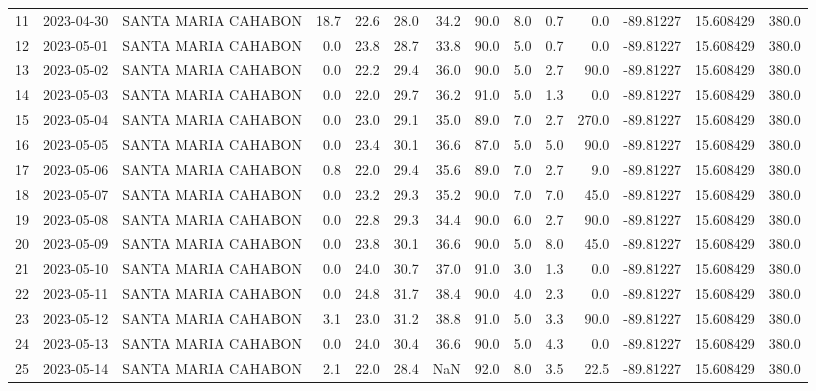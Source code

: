 \documentclass[12pt]{article}
\begin{document}
\begin{center}
\begin{tabular}{lllrrrrrrrrrrr}
11  & 2023-04-30 &  SANTA MARIA CAHABON &    18.7 &  22.6 &   28.0 &  34.2 &     90.0 &  8.0 &         0.7 &         0.0 & -89.81227 &  15.608429 &    380.0 \\
12  & 2023-05-01 &  SANTA MARIA CAHABON &     0.0 &  23.8 &   28.7 &  33.8 &     90.0 &  5.0 &         0.7 &         0.0 & -89.81227 &  15.608429 &    380.0 \\
13  & 2023-05-02 &  SANTA MARIA CAHABON &     0.0 &  22.2 &   29.4 &  36.0 &     90.0 &  5.0 &         2.7 &        90.0 & -89.81227 &  15.608429 &    380.0 \\
14  & 2023-05-03 &  SANTA MARIA CAHABON &     0.0 &  22.0 &   29.7 &  36.2 &     91.0 &  5.0 &         1.3 &         0.0 & -89.81227 &  15.608429 &    380.0 \\
15  & 2023-05-04 &  SANTA MARIA CAHABON &     0.0 &  23.0 &   29.1 &  35.0 &     89.0 &  7.0 &         2.7 &       270.0 & -89.81227 &  15.608429 &    380.0 \\
16  & 2023-05-05 &  SANTA MARIA CAHABON &     0.0 &  23.4 &   30.1 &  36.6 &     87.0 &  5.0 &         5.0 &        90.0 & -89.81227 &  15.608429 &    380.0 \\
17  & 2023-05-06 &  SANTA MARIA CAHABON &     0.8 &  22.0 &   29.4 &  35.6 &     89.0 &  7.0 &         2.7 &         9.0 & -89.81227 &  15.608429 &    380.0 \\
18  & 2023-05-07 &  SANTA MARIA CAHABON &     0.0 &  23.2 &   29.3 &  35.2 &     90.0 &  7.0 &         7.0 &        45.0 & -89.81227 &  15.608429 &    380.0 \\
19  & 2023-05-08 &  SANTA MARIA CAHABON &     0.0 &  22.8 &   29.3 &  34.4 &     90.0 &  6.0 &         2.7 &        90.0 & -89.81227 &  15.608429 &    380.0 \\
20  & 2023-05-09 &  SANTA MARIA CAHABON &     0.0 &  23.8 &   30.1 &  36.6 &     90.0 &  5.0 &         8.0 &        45.0 & -89.81227 &  15.608429 &    380.0 \\
21  & 2023-05-10 &  SANTA MARIA CAHABON &     0.0 &  24.0 &   30.7 &  37.0 &     91.0 &  3.0 &         1.3 &         0.0 & -89.81227 &  15.608429 &    380.0 \\
22  & 2023-05-11 &  SANTA MARIA CAHABON &     0.0 &  24.8 &   31.7 &  38.4 &     90.0 &  4.0 &         2.3 &         0.0 & -89.81227 &  15.608429 &    380.0 \\
23  & 2023-05-12 &  SANTA MARIA CAHABON &     3.1 &  23.0 &   31.2 &  38.8 &     91.0 &  5.0 &         3.3 &        90.0 & -89.81227 &  15.608429 &    380.0 \\
24  & 2023-05-13 &  SANTA MARIA CAHABON &     0.0 &  24.0 &   30.4 &  36.6 &     90.0 &  5.0 &         4.3 &         0.0 & -89.81227 &  15.608429 &    380.0 \\
25  & 2023-05-14 &  SANTA MARIA CAHABON &     2.1 &  22.0 &   28.4 &   NaN &     92.0 &  8.0 &         3.5 &        22.5 & -89.81227 &  15.608429 &    380.0 \\
\bottomrule
\end{tabular}

        
        \end{center}
        
\end{document}
